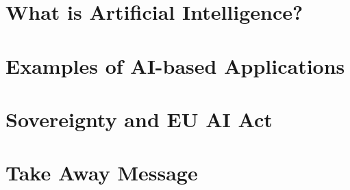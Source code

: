 


\begin{bibliographysection}

\part[author={Concepts and Key Models of AI in Modern Applications}]{What is Artificial Intelligence?}








\part[author={Mostly from CIAD Projects}]{Examples of AI-based Applications}







\part[author={The Point of View of a Technologist}]{Sovereignty and EU AI Act}


\part{Take Away Message}


\appendix

\end{bibliographysection}

\endinput
